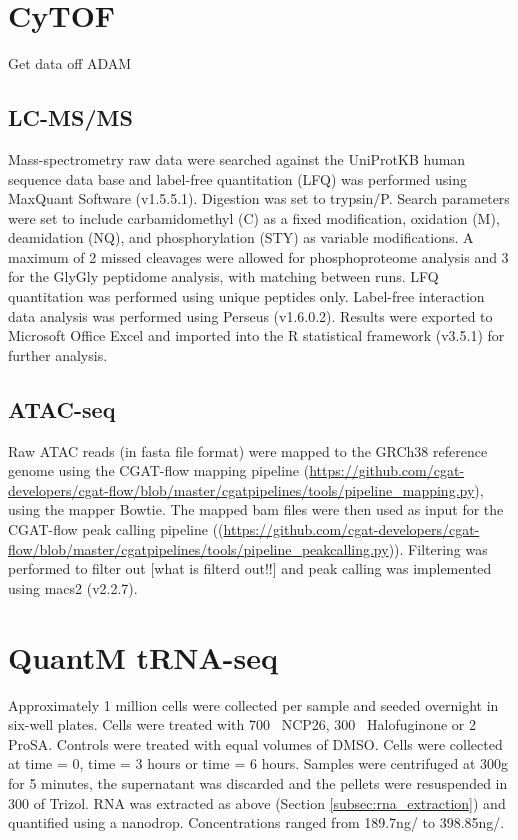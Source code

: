 \section{CyTOF}
Get data off ADAM


\subsection{LC-MS/MS}
Mass-spectrometry raw data were searched against the UniProtKB human sequence data base and label-free quantitation (LFQ) was performed using MaxQuant Software (v1.5.5.1).
Digestion was set to trypsin/P.
Search parameters were set to include carbamidomethyl (C) as a fixed modification, oxidation (M), deamidation (NQ), and phosphorylation (STY) as variable modifications.
A maximum of 2 missed cleavages were allowed for phosphoproteome analysis and 3 for the GlyGly peptidome analysis, with matching between runs.
LFQ quantitation was performed using unique peptides only.
Label-free interaction data analysis was performed using Perseus (v1.6.0.2).
Results were exported to Microsoft Office Excel and imported into the R statistical framework (v3.5.1) for further analysis.

\subsection{ATAC-seq}
Raw ATAC reads (in fasta file format) were mapped to the GRCh38 reference genome using the CGAT-flow mapping pipeline (\url{https://github.com/cgat-developers/cgat-flow/blob/master/cgatpipelines/tools/pipeline_mapping.py}), using the mapper Bowtie.
The mapped bam files were then used as input for the CGAT-flow peak calling pipeline ((\url{https://github.com/cgat-developers/cgat-flow/blob/master/cgatpipelines/tools/pipeline_peakcalling.py})).
Filtering was performed to filter out [what is filterd out!!] and peak calling was implemented using macs2 (v2.2.7)\cite{zhang2008model}.


\section{QuantM tRNA-seq}\label{sec:quantm}
Approximately 1 million cells were collected per sample and seeded overnight in six-well plates.
Cells were treated with 700\si{\nano\Molar} NCP26, 300\si{\nano\Molar} Halofuginone or 2\si{\micro\Molar} ProSA.
Controls were treated with equal volumes of DMSO.
Cells were collected at time = 0, time = 3 hours or time = 6 hours.
Samples were centrifuged at 300g for 5 minutes, the supernatant was discarded and the pellets were resuspended in 300\ul{} of Trizol.
RNA was extracted as above (Section \ref{subsec:rna_extraction}) and quantified using a nanodrop.
Concentrations ranged from  189.7\si{\ng}/\ul{} to 398.85\si{\ng}/\ul{}.

